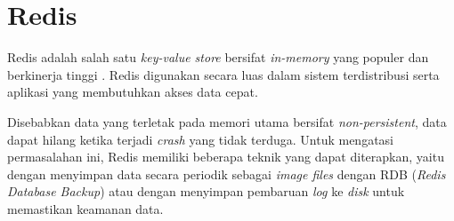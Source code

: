 \section{Redis}

Redis adalah salah satu \textit{key-value store} bersifat \textit{in-memory} yang populer dan berkinerja tinggi \parencite{chen2016towards}. Redis digunakan secara luas dalam sistem terdistribusi serta aplikasi yang membutuhkan akses data cepat.

Disebabkan data yang terletak pada memori utama bersifat \textit{non-persistent}, data dapat hilang ketika terjadi \textit{crash} yang tidak terduga. Untuk mengatasi permasalahan ini, Redis memiliki beberapa teknik yang dapat diterapkan, yaitu dengan menyimpan data secara periodik sebagai \textit{image files} dengan RDB (\textit{Redis Database Backup}) atau dengan menyimpan pembaruan \textit{log} ke \textit{disk} untuk memastikan keamanan data.


